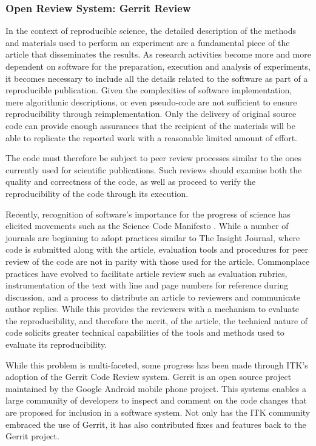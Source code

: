 \documentclass{frontiersENG} %
\begin{document}
\subsubsection{Open Review System: Gerrit Review} In the context of
reproducible science, the detailed description of the methods and materials
used to perform an experiment are a fundamental piece of the article that
disseminates the results. As research activities become more and more dependent
on software for the preparation, execution and analysis of experiments, it
becomes necessary to include all the details related to the software as part of
a reproducible publication. Given the complexities of software implementation,
mere algorithmic descriptions, or even pseudo-code are not sufficient to ensure
reproducibility through reimplementation. Only the delivery of original source
code can provide enough assurances that the recipient of the materials will be
able to replicate the reported work with a reasonable limited amount of effort.

The code must therefore be subject to peer review processes similar to the ones
currently used for scientific publications. Such reviews should examine both
the quality and correctness of the code, as well as proceed to verify the
reproducibility of the code through its execution.

Recently, recognition of software’s importance for the progress of science has
elicited movements such as the Science Code Manifesto \cite{Barnes2011}. While
a number of journals are beginning to adopt practices similar to The Insight
Journal, where code is submitted along with the article, evaluation tools and
procedures for peer review of the code are not in parity with those used for
the article.  Commonplace practices have evolved to facilitate article review
such as evaluation rubrics, instrumentation of the text with line and page
numbers for reference during discussion, and a process to distribute an article
to reviewers and communicate author replies.  While this provides the reviewers
with a mechanism to evaluate the reproducibility, and therefore the merit, of
the article, the technical nature of code solicits greater technical
capabilities of the tools and methods used to evaluate its reproducibility.

While this problem is multi-faceted, some progress has been made through ITK’s
adoption of the Gerrit Code Review system.  Gerrit is an open source project
maintained by the Google Android mobile phone project. This systems enables a
large community of developers to inspect and comment on the code changes that
are proposed for inclusion in a software system. Not only has the ITK community
embraced the use of Gerrit, it has also contributed fixes and features back to
the Gerrit project.
\end{document}
